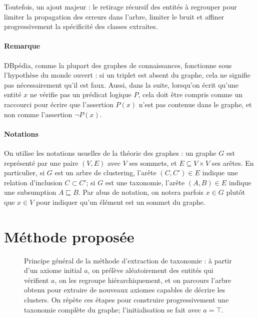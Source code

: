 Toutefois, un ajout majeur : le retirage récursif des entités à regrouper pour limiter la propagation des erreurs dans l'arbre, limiter le bruit et affiner progressivement la spécificité des classes extraites.  %

\paragraph{Remarque}

DBpédia, comme la plupart des graphes de connaissances, fonctionne sous l'hypothèse du monde ouvert : si un triplet est absent du graphe, cela ne signifie pas nécessairement qu'il est faux. Aussi, dans la suite, lorsqu'on écrit qu'une entité $x$ ne vérifie pas un prédicat logique $P$, cela doit être compris comme un raccourci pour écrire que l'assertion $P(x)$ n'est pas contenue dans le graphe, et non comme l'assertion $\neg P(x)$.

\paragraph{Notations}

On utilise les notations usuelles de la théorie des graphes : un graphe $G$ est représenté par une paire $(V, E)$ avec $V$ ses sommets, et $E \subseteq V \times V$ ses arêtes. En particulier, si $G$ est un arbre de clustering, l'arête $(C, C') \in E$ indique une relation d'inclusion $C \subset C'$; si $G$ est une taxonomie, l'arête $(A, B) \in E$ indique une subsumption $A \sqsubseteq B$. Par abus de notation, on notera parfois $x \in G$ plutôt que $x \in V$ pour indiquer qu'un élément est un sommet du graphe.

\section{Méthode proposée}

\begin{figure}[h]
    \centering
    
    \caption[Aperçu de la méthode d'extraction de taxonomie expressive]{Principe général de la méthode d'extraction de taxonomie : à partir d'un axiome initial $a$, on prélève aléatoirement des entités qui vérifient $a$, on les regroupe hiérarchiquement, et on parcours l'arbre obtenu pour extraire de nouveaux axiomes capables de décrire les clusters. On répète ces étapes pour construire progressivement une taxonomie complète du graphe; l'initialisation se fait avec $a = \top$.}
    \label{fig:texp-overview}
\end{figure}

